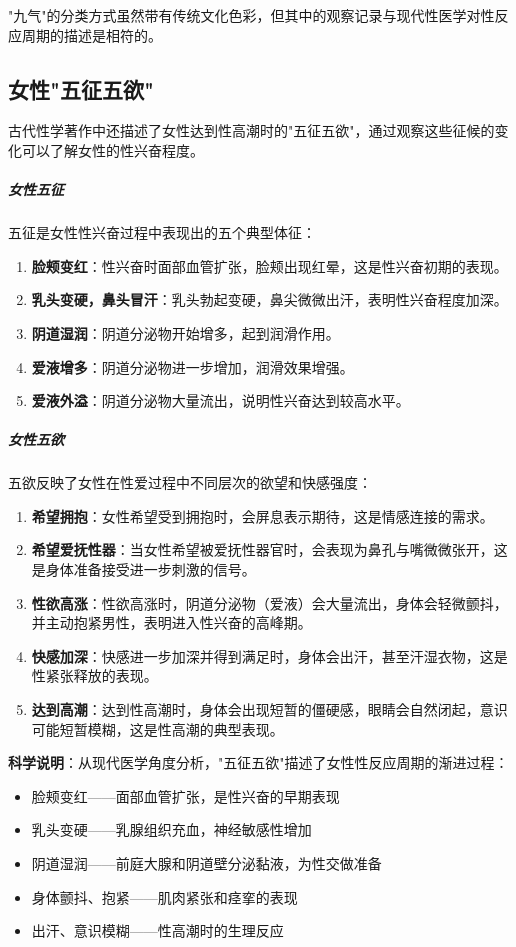\begin{enumerate}
"九气"的分类方式虽然带有传统文化色彩，但其中的观察记录与现代性医学对性反应周期的描述是相符的。

\subsection{女性"五征五欲"}

古代性学著作中还描述了女性达到性高潮时的"五征五欲"，通过观察这些征候的变化可以了解女性的性兴奋程度。

\subparagraph{女性五征}

五征是女性性兴奋过程中表现出的五个典型体征：

\begin{enumerate}
    \item \textbf{脸颊变红}：性兴奋时面部血管扩张，脸颊出现红晕，这是性兴奋初期的表现。
    \item \textbf{乳头变硬，鼻头冒汗}：乳头勃起变硬，鼻尖微微出汗，表明性兴奋程度加深。
    \item \textbf{阴道湿润}：阴道分泌物开始增多，起到润滑作用。
    \item \textbf{爱液增多}：阴道分泌物进一步增加，润滑效果增强。
    \item \textbf{爱液外溢}：阴道分泌物大量流出，说明性兴奋达到较高水平。
\end{enumerate}

\subparagraph{女性五欲}

五欲反映了女性在性爱过程中不同层次的欲望和快感强度：

\begin{enumerate}
    \item \textbf{希望拥抱}：女性希望受到拥抱时，会屏息表示期待，这是情感连接的需求。
    \item \textbf{希望爱抚性器}：当女性希望被爱抚性器官时，会表现为鼻孔与嘴微微张开，这是身体准备接受进一步刺激的信号。
    \item \textbf{性欲高涨}：性欲高涨时，阴道分泌物（爱液）会大量流出，身体会轻微颤抖，并主动抱紧男性，表明进入性兴奋的高峰期。
    \item \textbf{快感加深}：快感进一步加深并得到满足时，身体会出汗，甚至汗湿衣物，这是性紧张释放的表现。
    \item \textbf{达到高潮}：达到性高潮时，身体会出现短暂的僵硬感，眼睛会自然闭起，意识可能短暂模糊，这是性高潮的典型表现。
\end{enumerate}

\textbf{科学说明}：从现代医学角度分析，"五征五欲"描述了女性性反应周期的渐进过程：
\begin{itemize}
    \item 脸颊变红——面部血管扩张，是性兴奋的早期表现
    \item 乳头变硬——乳腺组织充血，神经敏感性增加
    \item 阴道湿润——前庭大腺和阴道壁分泌黏液，为性交做准备
    \item 身体颤抖、抱紧——肌肉紧张和痉挛的表现
    \item 出汗、意识模糊——性高潮时的生理反应
\end{itemize}


\end{enumerate}
